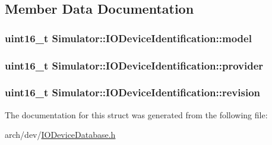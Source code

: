 \subsection{Member Data Documentation}
\hypertarget{struct_simulator_1_1_i_o_device_identification_a3717c2349d4a0efe7698b5a87e5acd3f}{
\subsubsection[{model}]{\setlength{\rightskip}{0pt plus 5cm}uint16\+\_\+t Simulator\+::\+I\+O\+Device\+Identification\+::model}}\label{struct_simulator_1_1_i_o_device_identification_a3717c2349d4a0efe7698b5a87e5acd3f}
\hypertarget{struct_simulator_1_1_i_o_device_identification_aa40ec1760434450d3c1dc9a665d36abf}{
\subsubsection[{provider}]{\setlength{\rightskip}{0pt plus 5cm}uint16\+\_\+t Simulator\+::\+I\+O\+Device\+Identification\+::provider}}\label{struct_simulator_1_1_i_o_device_identification_aa40ec1760434450d3c1dc9a665d36abf}
\hypertarget{struct_simulator_1_1_i_o_device_identification_aaf9f036ceb58b4f67f56c183863bc72a}{
\subsubsection[{revision}]{\setlength{\rightskip}{0pt plus 5cm}uint16\+\_\+t Simulator\+::\+I\+O\+Device\+Identification\+::revision}}\label{struct_simulator_1_1_i_o_device_identification_aaf9f036ceb58b4f67f56c183863bc72a}


The documentation for this struct was generated from the following file\+:\begin{DoxyCompactItemize}
\item 
arch/dev/\hyperlink{_i_o_device_database_8h}{I\+O\+Device\+Database.\+h}\end{DoxyCompactItemize}
